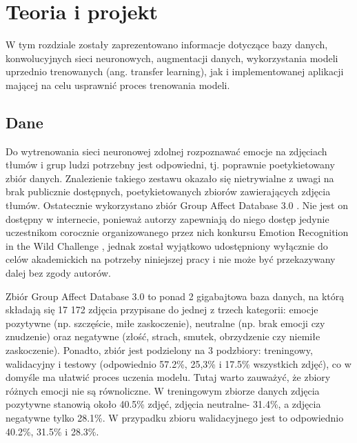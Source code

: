 \chapter{Teoria i projekt}
\thispagestyle{chapterBeginStyle}
\label{chapter4}


W tym rozdziale zostały zaprezentowano informacje dotyczące bazy danych, konwolucyjnych sieci neuronowych, augmentacji danych, wykorzystania modeli uprzednio trenowanych (ang. transfer learning), jak i implementowanej aplikacji mającej na celu usprawnić proces trenowania modeli.


\section{Dane}
Do wytrenowania sieci neuronowej zdolnej rozpoznawać emocje na zdjęciach tłumów i grup ludzi potrzebny jest odpowiedni, tj. poprawnie poetykietowany zbiór danych. Znalezienie takiego zestawu okazało się nietrywialne z uwagi na brak publicznie dostępnych, poetykietowanych zbiorów zawierających zdjęcia tłumów. Ostatecznie wykorzystano zbiór Group Affect Database 3.0 \cite{GAD}. Nie jest on dostępny w internecie, ponieważ autorzy zapewniają do niego dostęp jedynie uczestnikom corocznie organizowanego przez nich konkursu Emotion Recognition in the Wild Challenge \cite{EmotiwPage}\cite{EmotiwSummary}, jednak został wyjątkowo udostępniony wyłącznie do celów akademickich na potrzeby niniejszej pracy i nie może być przekazywany dalej bez zgody autorów. 

Zbiór Group Affect Database 3.0 to ponad 2 gigabajtowa baza danych, na którą składają się 17 172 zdjęcia przypisane do jednej z trzech kategorii: emocje pozytywne (np. szczęście, miłe zaskoczenie), neutralne (np. brak emocji czy znudzenie) oraz negatywne (złość, strach, smutek, obrzydzenie czy niemiłe zaskoczenie). Ponadto, zbiór jest podzielony na 3 podzbiory: treningowy, walidacyjny i testowy (odpowiednio 57.2\%, 25,3\% i 17.5\% wszystkich zdjęć), co w domyśle ma ułatwić proces uczenia modelu. Tutaj warto zauważyć, że zbiory różnych emocji nie są równoliczne.%
W treningowym zbiorze danych zdjęcia pozytywne stanowią około 40.5\% zdjęć, zdjęcia neutralne- 31.4\%, a zdjęcia negatywne tylko 28.1\%. W przypadku zbioru walidacyjnego jest to odpowiednio 40.2\%, 31.5\% i 28.3\%.

